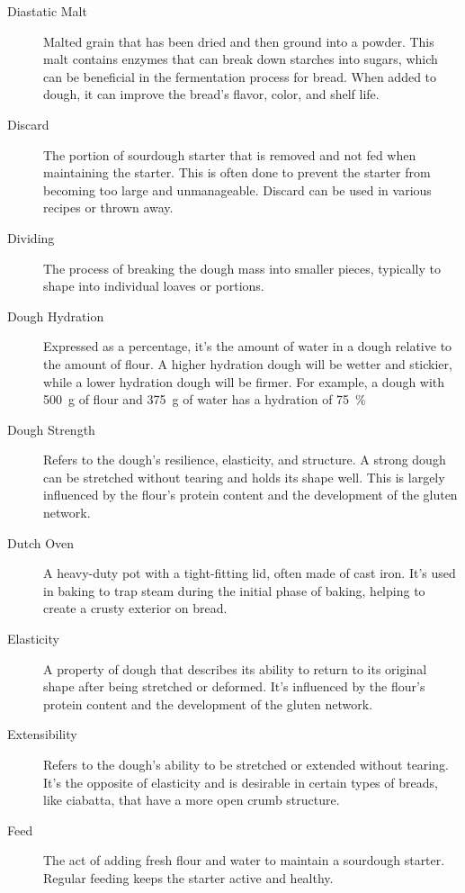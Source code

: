 \begin{description}
\item[Diastatic Malt] Malted grain that has been dried and then ground into a powder.
This malt contains enzymes that can break down starches into sugars, which can be
beneficial in the fermentation process for bread. When added to dough, it can improve
the bread's flavor, color, and shelf life.

\item[Discard] The portion of sourdough starter that is removed and not fed when
maintaining the starter. This is often done to prevent the starter from becoming too
large and unmanageable. Discard can be used in various recipes or thrown away.

\item[Dividing] The process of breaking the dough mass into smaller pieces,
typically to shape into individual loaves or portions.

\item[Dough Hydration] Expressed as a percentage, it's the amount of water in a
dough relative to the amount of flour. A higher hydration dough will be wetter and
stickier, while a lower hydration dough will be firmer. For example, a dough
with \SI{500}{\gram} of flour and \SI{375}{\gram} of water has a hydration of
\SI{75}{\percent}

\item[Dough Strength] Refers to the dough's resilience, elasticity, and structure.
A strong dough can be stretched without tearing and holds its shape well. This is
largely influenced by the flour's protein content and the development of the gluten
network.

\item[Dutch Oven] A heavy-duty pot with a tight-fitting lid, often made of cast
iron. It's used in baking to trap steam during the initial phase of baking, helping
to create a crusty exterior on bread.

\item[Elasticity] A property of dough that describes its ability to return to
its original shape after being stretched or deformed. It's influenced by the flour's
protein content and the development of the gluten network.

\item[Extensibility] Refers to the dough’s ability to be stretched or extended
without tearing. It's the opposite of elasticity and is desirable in certain types
of breads, like ciabatta, that have a more open crumb structure.

\item[Feed] The act of adding fresh flour and water to maintain a sourdough
starter. Regular feeding keeps the starter active and healthy.


\end{description}
